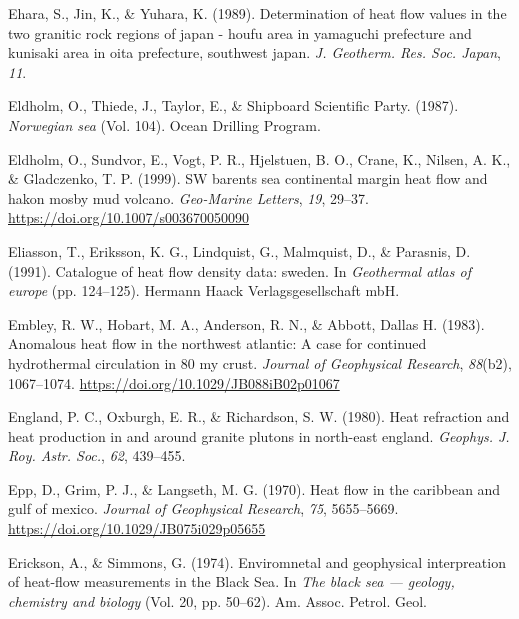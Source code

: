 \begin{CSLReferences}{1}{1}
\leavevmode{}%
Ehara, S., Jin, K., \& Yuhara, K. (1989). Determination of heat flow values in the two granitic rock regions of japan - houfu area in yamaguchi prefecture and kunisaki area in oita prefecture, southwest japan. \emph{J. Geotherm. Res. Soc. Japan}, \emph{11}.

\leavevmode{}%
Eldholm, O., Thiede, J., Taylor, E., \& Shipboard Scientific Party. (1987). \emph{Norwegian sea} (Vol. 104). Ocean Drilling Program.

\leavevmode{}%
Eldholm, O., Sundvor, E., Vogt, P. R., Hjelstuen, B. O., Crane, K., Nilsen, A. K., \& Gladczenko, T. P. (1999). SW barents sea continental margin heat flow and hakon mosby mud volcano. \emph{Geo-Marine Letters}, \emph{19}, 29--37. \url{https://doi.org/10.1007/s003670050090}

\leavevmode{}%
Eliasson, T., Eriksson, K. G., Lindquist, G., Malmquist, D., \& Parasnis, D. (1991). Catalogue of heat flow density data: sweden. In \emph{Geothermal atlas of europe} (pp. 124--125). Hermann Haack Verlagsgesellschaft mbH.

\leavevmode{}%
Embley, R. W., Hobart, M. A., Anderson, R. N., \& Abbott, Dallas H. (1983). Anomalous heat flow in the northwest atlantic: A case for continued hydrothermal circulation in 80 my crust. \emph{Journal of Geophysical Research}, \emph{88}(b2), 1067--1074. \url{https://doi.org/10.1029/JB088iB02p01067}

\leavevmode{}%
England, P. C., Oxburgh, E. R., \& Richardson, S. W. (1980). Heat refraction and heat production in and around granite plutons in north-east england. \emph{Geophys. J. Roy. Astr. Soc.}, \emph{62}, 439--455.

\leavevmode{}%
Epp, D., Grim, P. J., \& Langseth, M. G. (1970). Heat flow in the caribbean and gulf of mexico. \emph{Journal of Geophysical Research}, \emph{75}, 5655--5669. \url{https://doi.org/10.1029/JB075i029p05655}

\leavevmode{}%
Erickson, A., \& Simmons, G. (1974). Enviromnetal and geophysical interpreation of heat-flow measurements in the {Black Sea}. In \emph{The black sea --- geology, chemistry and biology} (Vol. 20, pp. 50--62). Am. Assoc. Petrol. Geol.


\end{CSLReferences}
